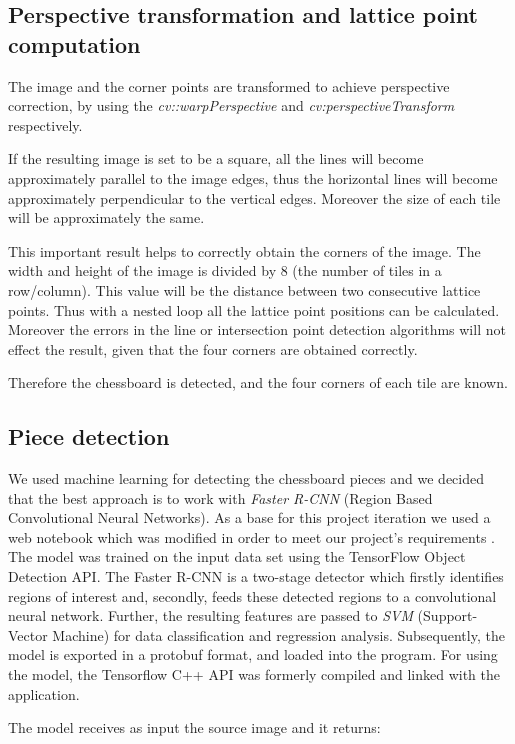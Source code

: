\documentclass[conference]{IEEEtran}
\begin{document}
\subsection{Perspective transformation and lattice point computation}

The image and the corner points are transformed to achieve perspective correction, by using the \emph{cv::warpPerspective} and \emph{cv:perspectiveTransform} respectively.

If the resulting image is set to be a square, all the lines will become approximately parallel to the image edges, thus the horizontal lines will become approximately perpendicular to the vertical edges. Moreover the size of each tile will be approximately the same.

This important result helps to correctly obtain the corners of the image. The width and height of the image is divided by 8 (the number of tiles in a row/column). This value will be the distance between two consecutive lattice points. Thus with a nested loop all the lattice point positions can be calculated. Moreover the errors in the line or intersection point detection algorithms will not effect the result, given that the four corners are obtained correctly.

Therefore the chessboard is detected, and the four corners of each tile are known.

\subsection{Piece detection}
We used machine learning for detecting the chessboard pieces and we decided that the best approach is to work with \emph{Faster R-CNN} (Region Based Convolutional Neural Networks). As a base for this project iteration we used a web notebook which was modified in order to meet our project's requirements \cite{collab}. The model was trained on the input data set using the TensorFlow Object Detection API. The Faster R-CNN is a two-stage detector which firstly identifies regions of interest and, secondly, feeds these detected regions to a convolutional neural network. Further, the resulting features are passed to \emph{SVM} (Support-Vector Machine) for data classification and regression analysis. Subsequently, the model is exported in a protobuf format, and loaded into the program. For using the model, the Tensorflow C++ API was formerly compiled and linked with the application.

The model receives as input the source image and it returns:
\end{document}
